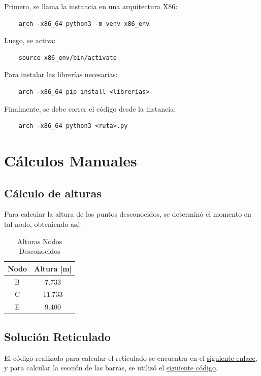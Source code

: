 Primero, se llama la instancia en una arquitectura X86:

\begin{verbatim}
    arch -x86_64 python3 -m venv x86_env
\end{verbatim}

Luego, se activa:

\begin{verbatim}
    source x86_env/bin/activate
\end{verbatim}

Para instalar las librerías necesarias:

\begin{verbatim}
    arch -x86_64 pip install <librerías>
\end{verbatim}

Finalmente, se debe correr el código desde la instancia:

\begin{verbatim}
    arch -x86_64 python3 <ruta>.py
\end{verbatim}

\section{Cálculos Manuales}

\subsection{Cálculo de alturas}

Para calcular la altura de los puntos desconocidos, se determinó el momento en tal nodo, obteniendo así:

\begin{table}[H]
    \centering
    \begin{tabular}{|c|c|}
    \hline
    \textbf{Nodo} & \textbf{Altura [m]}  \\ 
    \hline
    B & 7.733  \\ 
    C & 11.733  \\ 
    E & 9.400 \\ 
    \hline
    \end{tabular}
    \caption{Alturas Nodos Desconocidos}
\end{table}

\subsection{Solución Reticulado}

El código realizado para calcular el reticulado se encuentra en el \href{https://github.com/LukasWolff2002/PROYECTO_3_MCOC/blob/main/CODIGO/CODIGO_MANUAL/solucion_reticulado.py}{siguiente enlace}, y para calcular la sección de las barras, se utilizó el \href{https://github.com/LukasWolff2002/PROYECTO_3_MCOC/blob/main/CODIGO/CODIGO_MANUAL/tipo_barras.py}{siguiente código}.

